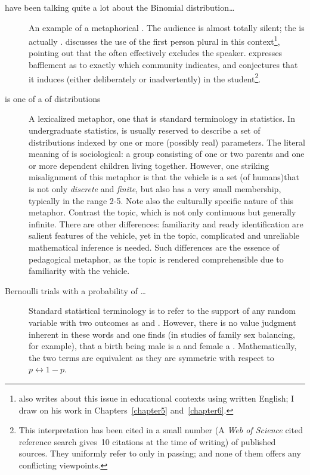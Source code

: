 \begin{description}
\item[ have been talking quite a lot about the Binomial
  distribution\ldots]{An example of a metaphorical .  The
  audience is almost totally silent; the  is actually
  .   discusses the use of the first
  person plural in this context\footnote{\citeauthor{pimm1984} also
    writes about this issue in educational contexts using written
    English; I draw on his work in Chapters~\ref{chapter5}
    and~\ref{chapter6}.}, pointing out that the  often effectively excludes the speaker.  \citeauthor{pimm1984}
  expresses bafflement as to exactly which community 
  indicates, and conjectures that it induces (either deliberately or
  inadvertently)  in the
  student\footnote{This interpretation has been cited in a small
    number (A \emph{Web of Science} cited reference search gives~10
    citations at the time of writing) of published sources.  They
    uniformly refer to  only in passing; and none of
    them offers any conflicting viewpoints.}.} 
\item[ is one of a  of
  distributions]{A lexicalized metaphor, one that is standard
  terminology in statistics.  In undergraduate statistics,
   is usually reserved to describe a set of
  distributions indexed by one or more (possibly real) parameters.
  The literal meaning of  is sociological: a group
  consisting of one or two parents and one or more dependent children
  living together.  However, one striking misalignment of this
  metaphor is that the vehicle is a set (of humans)that is not only
  \emph{discrete} and \emph{finite}, but also has a very small
  membership, typically in the range 2-5. Note also the culturally
  specific nature of this metaphor.  Contrast the topic, which is not
  only continuous but generally infinite.  There are other
  differences: familiarity and ready identification are salient
  features of the vehicle, yet in the topic, complicated and
  unreliable mathematical inference is needed.  Such differences are
  the essence of pedagogical metaphor, as the topic is rendered
  comprehensible due to familiarity with the vehicle.}
\item[Bernoulli trials with a probability of
  \ldots]{Standard statistical terminology is to
  refer to the support of any random variable with two outcomes as
   and .  However, there is no value
  judgment inherent in these words and one finds (in studies of
  family sex balancing, for example), that a birth being male is a
   and female a .  Mathematically, the
  two terms are equivalent as they are symmetric with respect
  to~$p\longleftrightarrow 1-p$.

}
\end{description}
